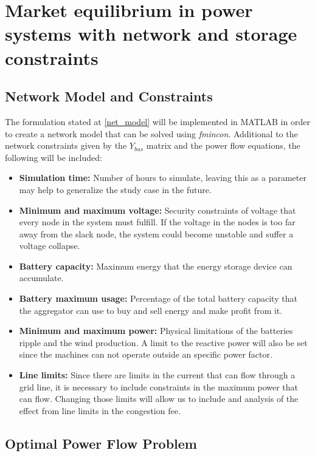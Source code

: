 \chapter{Market equilibrium in power systems with network and storage constraints}
\label{chap:meth}


\section{Network Model and Constraints}

The formulation stated at \ref{net_model} will be implemented in MATLAB in order to create a network model that can be solved using \textit{fmincon}. Additional to the network constraints given by the $Y_{bus}$ matrix and the power flow equations, the following will be included:

\begin{itemize}
    \item \textbf{Simulation time:} Number of hours to simulate, leaving this as a parameter may help to generalize the study case in the future.
    \item \textbf{Minimum and maximum voltage:} Security constraints of voltage that every node in the system must fulfill. If the voltage in the nodes is too far away from the slack node, the system could become unstable and suffer a voltage collapse.
    \item \textbf{Battery capacity:} Maximum energy that the energy storage device can accumulate.
    \item \textbf{Battery maximum usage:} Percentage of the total battery capacity that the aggregator can use to buy and sell energy and make profit from it.
    \item \textbf{Minimum and maximum power:} Physical limitations of the batteries ripple and the wind production. A limit to the reactive power will also be set since the machines can not operate outside an specific power factor.
    \item \textbf{Line limits:} Since there are limits in the current that can flow through a grid line, it is necessary to include constraints in the maximum power that can flow. Changing those limits will allow us to include and analysis of the effect from line limits in the congestion fee.
\end{itemize}


\section{Optimal Power Flow Problem}

